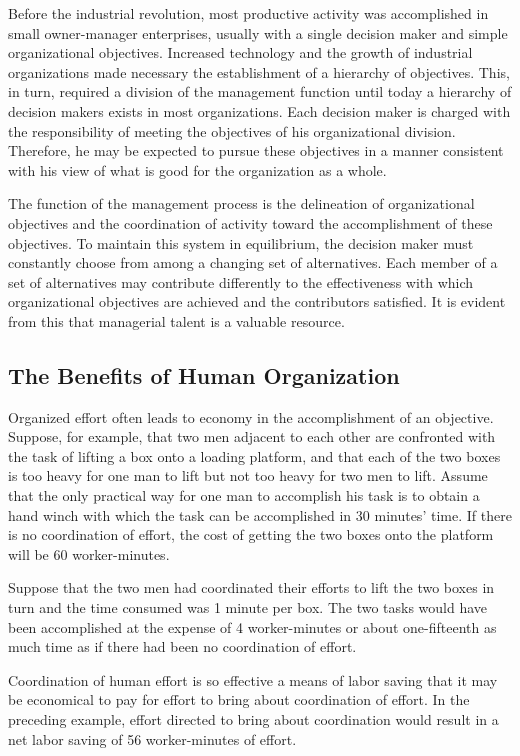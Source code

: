 Before the industrial revolution, most productive activity was accomplished in small owner-manager enterprises, usually with a single decision maker and simple organizational objectives. Increased technology and the growth of industrial organizations made necessary the establishment of a hierarchy of objectives.  This, in turn, required a division of the management function until today a hierarchy of decision makers exists in most organizations. Each decision maker is charged with the responsibility of meeting the objectives of his organizational division. Therefore, he may be expected to pursue these objectives in a manner consistent with his view of what is good for the organization as a whole.

The function of the management process is the delineation of organizational objectives and the coordination of activity toward the accomplishment of these objectives. To maintain this system in equilibrium, the decision maker must constantly choose from among a changing set of alternatives. Each member of a set of alternatives may contribute differently to the effectiveness with which organizational objectives are achieved and the contributors satisfied. It is evident from this that managerial talent is a valuable resource.

\subsection{The Benefits of Human Organization}

Organized effort often leads to economy in the accomplishment of an objective. Suppose, for example, that two men adjacent to each other are confronted with the task of lifting a box onto a loading platform, and that each of the two boxes is too heavy for one man to lift but not too heavy for two men to lift. Assume that the only practical way for one man to accomplish his task is to obtain a hand winch with which the task can be accomplished in 30 minutes’ time. If there is no coordination of effort, the cost of getting the two boxes onto the platform will be 60 worker-minutes.

Suppose that the two men had coordinated their efforts to lift the two boxes in turn and the time consumed was 1 minute per box. The two tasks would have been accomplished at the expense of 4 worker-minutes or about one-fifteenth as much time as if there had been no coordination of effort.

Coordination of human effort is so effective a means of labor saving that it may be economical to pay for effort to bring about coordination of effort. In the preceding example, effort directed to bring about coordination would result in a net labor saving of 56 worker-minutes of effort.

